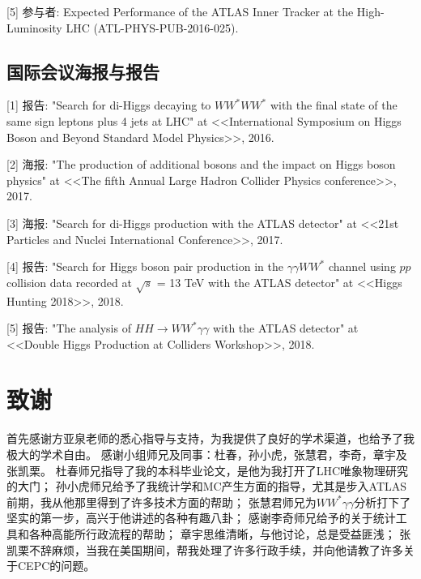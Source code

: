 [5] 参与者: Expected Performance of the ATLAS Inner Tracker at the High-Luminosity LHC (ATL-PHYS-PUB-2016-025).

\section*{国际会议海报与报告}
[1] 报告: "Search for di-Higgs decaying to $WW^*WW^*$ with the final state of the same sign leptons plus 4 jets at LHC" at <<International Symposium on Higgs Boson and Beyond Standard Model Physics>>, 2016.

[2] 海报: "The production of additional bosons and the impact on Higgs boson physics" at <<The fifth Annual Large Hadron Collider Physics conference>>, 2017.

[3] 海报: "Search for di-Higgs production with the ATLAS detector" at  <<21st Particles and Nuclei International Conference>>, 2017.

[4] 报告: "Search for Higgs boson pair production in the $\gamma\gamma WW^*$ channel using $pp$ collision data recorded at $\sqrt{s}$ = 13 TeV with the ATLAS detector" at <<Higgs Hunting 2018>>, 2018.

[5] 报告: "The analysis of $HH\rightarrow WW^*\gamma\gamma$ with the ATLAS detector" at <<Double Higgs Production at Colliders Workshop>>, 2018.




\chapter[致谢]{致\quad 谢}%
\thispagestyle{noheaderstyle}%

首先感谢方亚泉老师的悉心指导与支持，为我提供了良好的学术渠道，也给予了我极大的学术自由。
感谢小组师兄及同事：杜春，孙小虎，张慧君，李奇，章宇及张凯栗。
杜春师兄指导了我的本科毕业论文，是他为我打开了LHC唯象物理研究的大门；
孙小虎师兄给予了我统计学和MC产生方面的指导，尤其是步入ATLAS前期，我从他那里得到了许多技术方面的帮助；
张慧君师兄为$WW^*\gamma\gamma$分析打下了坚实的第一步，高兴于他讲述的各种有趣八卦；
感谢李奇师兄给予的关于统计工具和各种高能所行政流程的帮助；
章宇思维清晰，与他讨论，总是受益匪浅；
张凯栗不辞麻烦，当我在美国期间，帮我处理了许多行政手续，并向他请教了许多关于CEPC的问题。

